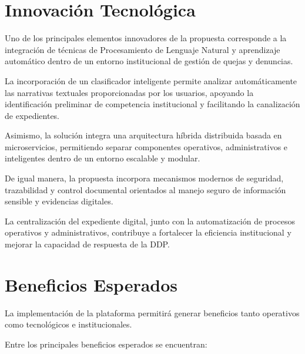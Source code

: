\section{Innovación Tecnológica}

Uno de los principales elementos innovadores de la propuesta corresponde a la integración de técnicas de Procesamiento de Lenguaje Natural y aprendizaje automático dentro de un entorno institucional de gestión de quejas y denuncias.

La incorporación de un clasificador inteligente permite analizar automáticamente las narrativas textuales proporcionadas por los usuarios, apoyando la identificación preliminar de competencia institucional y facilitando la canalización de expedientes.

Asimismo, la solución integra una arquitectura híbrida distribuida basada en microservicios, permitiendo separar componentes operativos, administrativos e inteligentes dentro de un entorno escalable y modular.

De igual manera, la propuesta incorpora mecanismos modernos de seguridad, trazabilidad y control documental orientados al manejo seguro de información sensible y evidencias digitales.

La centralización del expediente digital, junto con la automatización de procesos operativos y administrativos, contribuye a fortalecer la eficiencia institucional y mejorar la capacidad de respuesta de la DDP.

\section{Beneficios Esperados}

La implementación de la plataforma permitirá generar beneficios tanto operativos como tecnológicos e institucionales.

Entre los principales beneficios esperados se encuentran:


